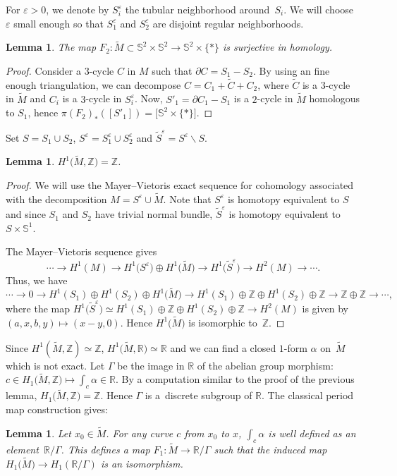 \documentclass[10pt,a4paper]{amsart}
\numberwithin{equation}{section}
\newtheorem{lem}[thm]{Lemma}
\newcommand{\eps}{\varepsilon}
\begin{document}
For $\eps>0$, we denote by $S_i^\eps$ the tubular neighborhood around~$S_i$. We will choose $\eps$ small enough so that $S_1^\eps$ and
$S_2^\eps$ are disjoint regular neighborhoods.

\begin{lem}\label{lem-S2}
 The map $F_2\colon \tilde M\subset \mathbb{S}^2\times\mathbb{S}^2\to\mathbb{S}^2\times\{\ast\}$ is
 surjective in homology.
\end{lem}
\begin{proof}
 Consider a $3$-cycle $C$ in $M$ such that $\partial C= S_1-S_2$. By using
 an fine enough triangulation, we can decompose $C=C_1+\tilde C+C_2$,
 where $\tilde C$ is a $3$-cycle in $\tilde M$ and $C_i$ is a
 $3$-cycle in $S_i^\eps$. Now, $S'_1=\partial C_1-S_1$ is a $2$-cycle in
 $\tilde M$ homologous to $S_1$, hence $\pi(F_2)_*([S'_1])=\big[\mathbb{S}^2\times\{\ast\}\big]$.
\end{proof}

Set $S=S_1\cup S_2$, $S^\eps=S_1^\eps\cup S_2^\eps$ and $\tilde
S^\eps=S^\eps\backslash S$.

\begin{lem}\label{lem-H1}
 $H^1\big(\tilde M,\mathbb{Z}\big)=\mathbb{Z}$.
\end{lem}

\begin{proof}
 We will use the Mayer--Vietoris exact sequence for cohomology
 associated with the decomposition $M=S^\eps\cup \tilde M$. Note that
 $S^\eps$ is homotopy equivalent to $S$ and
 since $S_1$ and $S_2$ have trivial normal bundle, $\tilde
 S^\eps$ is homotopy equivalent to $S\times\mathbb{S}^1$.

 The Mayer--Vietoris sequence gives
 \[\cdots\to H^1(M)\to H^1\big(S^\eps\big)\oplus
 H^1\big(\tilde M\big) \to H^1\big(\tilde S^\eps\big)\to H^2(M)\to\cdots.\]
 Thus, we have
 \[\cdots\to 0\to H^1(S_1)\oplus H^1(S_2)\oplus
 H^1\big(\tilde M\big) \to H^1(S_1)\oplus\mathbb{Z}\oplus
 H^1(S_2)\oplus\mathbb{Z}\to \mathbb{Z}\oplus\mathbb{Z}\to\cdots,\]
 where the map $ H^1\big(\tilde S^\eps\big)\simeq H^1(S_1)\oplus\mathbb{Z}\oplus
 H^1(S_2)\oplus\mathbb{Z}\to H^2(M)$ is given by
 $(a,x,b,y)\mapsto (x-y,0)$. Hence $H^1\big(\tilde M\big)$ is isomorphic to~$\mathbb{Z}$.
\end{proof}

Since $H^1(\tilde M,\mathbb{Z})\simeq \mathbb{Z}$, $H^1\big(\tilde
M,\mathbb{R}\big)\simeq \mathbb{R}$ and we can find a closed $1$-form
$\alpha$ on~$\tilde M$ which is not exact. Let
$\Gamma$ be the image in $\mathbb{R}$ of the abelian group morphism:
$c\in H_1\big(\tilde M,\mathbb{Z}\big)\mapsto \int_c\alpha\in\mathbb{R}$. By a
computation similar to the proof of the previous lemma, $H_1\big(\tilde
M,\mathbb{Z}\big)=\mathbb{Z}$. Hence $\Gamma$ is a~discrete subgroup of $\mathbb{R}$. The
classical period map construction gives:
\begin{lem}\label{lem-S1}
 Let $x_0\in\tilde M$. For any curve $c$ from $x_0$ to $x$,
 $\int_c\alpha$ is well defined as an element~$\mathbb{R}/\Gamma$. This
 defines a map $F_1\colon \tilde M\to\mathbb{R}/\Gamma$ such that the induced map
 $H_1\big(\tilde M\big)\to H_1(\mathbb{R}/\Gamma) $ is an isomorphism.
\end{lem}
\end{document}
